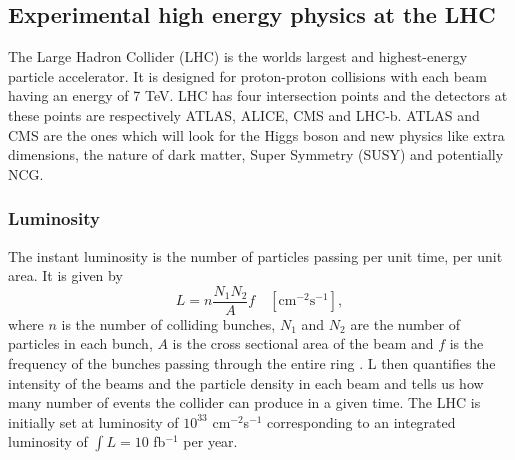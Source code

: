 \subsection{Experimental high energy physics at the LHC} \label{sec:lhc}
The Large Hadron Collider (LHC) is the worlds largest and highest-energy particle accelerator. It is designed for proton-proton collisions with each beam having an energy of 7 TeV. LHC has four intersection points and the detectors at these points are respectively ATLAS, ALICE, CMS and LHC-b. ATLAS and CMS are the ones which will look for the Higgs boson and new physics like extra dimensions, the nature of dark matter, Super Symmetry (SUSY) and potentially NCG.

\subsubsection{Luminosity}
The instant luminosity is the number of particles passing per unit time, per unit area. It is given by
\begin{equation}
	L=n\frac{N_{1}N_{2}}{A}f \quad [\mbox{cm}^{-2}\mbox{s}^{-1}],
\end{equation}
where $n$ is the number of colliding bunches, $N_{1}$ and $N_{2}$ are the number of particles in each bunch, $A$ is the cross sectional area of the beam and $f$ is the frequency of the bunches passing through the entire ring \cite{martin1998pp}. L then quantifies the intensity of the beams and the particle density in each beam and tells us how many number of events the collider can produce in a given time. The LHC is initially set at luminosity of $10^{33}$ cm$^{-2}$s$^{-1}$ corresponding to an integrated luminosity of $\int L = 10$ fb$^{-1}$ per year.

